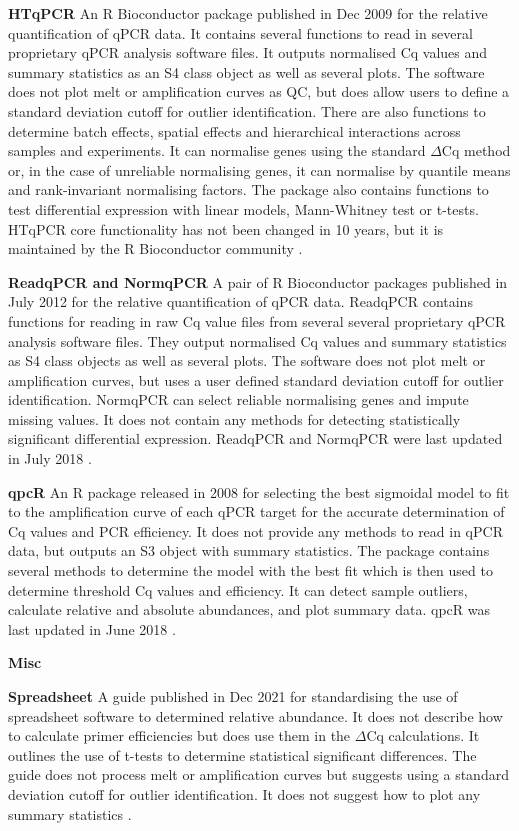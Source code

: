 \documentclass[../main.tex]{subfiles}
\begin{document}
\textbf{HTqPCR} An R Bioconductor package published in Dec 2009 for the relative quantification of qPCR data. 
It contains several functions to read in several proprietary qPCR analysis software files. 
It outputs normalised Cq values and summary statistics as an S4 class object as well as several plots. 
The software does not plot melt or amplification curves as QC, but does allow users to define a standard deviation cutoff for outlier identification. 
There are also functions to determine batch effects, spatial effects and hierarchical interactions across samples and experiments. 
It can normalise genes using the standard $\Delta$Cq method or, in the case of unreliable normalising genes, it can normalise by quantile means and rank-invariant normalising factors. 
The package also contains functions to test differential expression with linear models, Mann-Whitney test or t-tests. 
HTqPCR core functionality has not been changed in 10 years, but it is maintained by the R Bioconductor community \parencite{Dvinge2009}.

\textbf{ReadqPCR and NormqPCR} A pair of R Bioconductor packages published in July 2012 for the relative quantification of qPCR data. 
ReadqPCR contains functions for reading in raw Cq value files from several several proprietary qPCR analysis software files. 
They output normalised Cq values and summary statistics as S4 class objects as well as several plots. 
The software does not plot melt or amplification curves, but uses a user defined standard deviation cutoff for outlier identification. 
NormqPCR can select reliable normalising genes and impute missing values. 
It does not contain any methods for detecting statistically significant differential expression. 
ReadqPCR and NormqPCR were last updated in July 2018 \parencite{Perkins2012}.

\textbf{qpcR} An R package released in 2008 for selecting the best sigmoidal model to fit to the amplification curve of each qPCR target for the accurate determination of Cq values and PCR efficiency. 
It does not provide any methods to read in qPCR data, but outputs an S3 object with summary statistics. 
The package contains several methods to determine the model with the best fit which is then used to determine threshold Cq values and efficiency. 
It can detect sample outliers, calculate relative and absolute abundances, and plot summary data. qpcR was last updated in June 2018 \parencite{Ritz2008}.

\textbf{Misc}

\textbf{Spreadsheet} A guide published in Dec 2021 for standardising the use of spreadsheet software to determined relative abundance. 
It does not describe how to calculate primer efficiencies but does use them in the $\Delta$Cq calculations. 
It outlines the use of t-tests to determine statistical significant differences.  
The guide does not process melt or amplification curves but suggests using a standard deviation cutoff for outlier identification. 
It does not suggest how to plot any summary statistics \parencite{Ng2021}.
\end{document}
